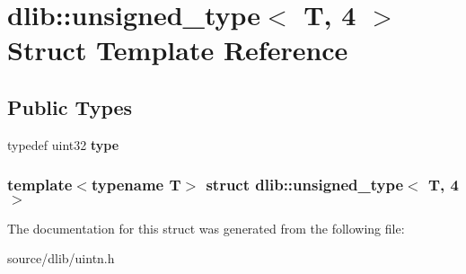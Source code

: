 \hypertarget{structdlib_1_1unsigned__type_3_01T_00_014_01_4}{
\section{dlib::unsigned\_\-type$<$ T, 4 $>$ Struct Template Reference}
\label{structdlib_1_1unsigned__type_3_01T_00_014_01_4}
}
\subsection*{Public Types}
\begin{DoxyCompactItemize}
\item 
\hypertarget{structdlib_1_1unsigned__type_3_01T_00_014_01_4_aa5489ca71a60073699dc35e70cb7f495}{
typedef uint32 {\bfseries type}}
\label{structdlib_1_1unsigned__type_3_01T_00_014_01_4_aa5489ca71a60073699dc35e70cb7f495}

\end{DoxyCompactItemize}
\subsubsection*{template$<$typename T$>$ struct dlib::unsigned\_\-type$<$ T, 4 $>$}



The documentation for this struct was generated from the following file:\begin{DoxyCompactItemize}
\item 
source/dlib/uintn.h\end{DoxyCompactItemize}
